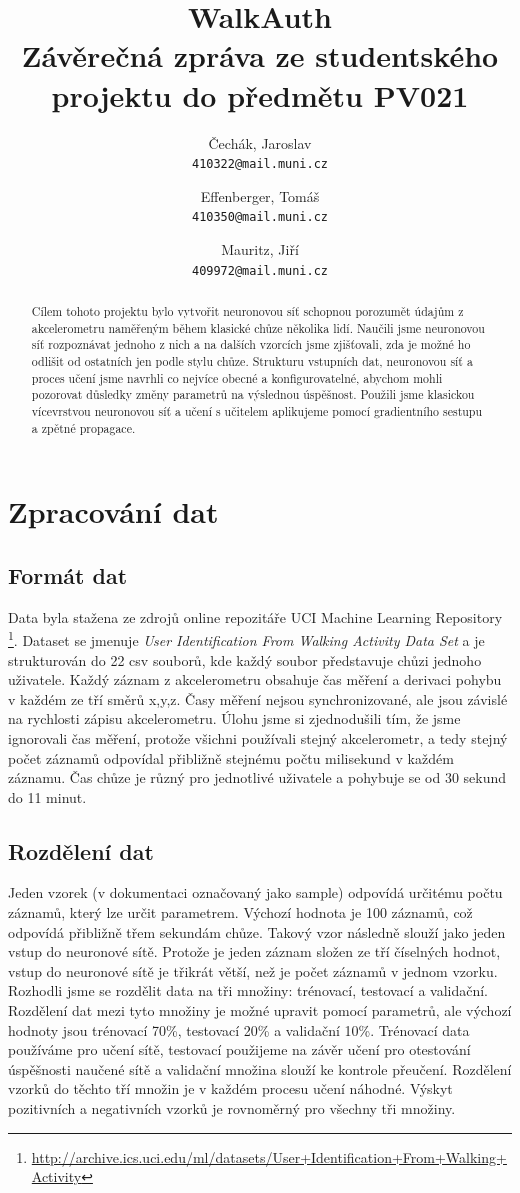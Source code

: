 \documentclass[a4paper, 10pt, twocolumn]{article}
\title{WalkAuth\\
\large Závěrečná zpráva ze studentského projektu do předmětu PV021
}
\author{Čechák, Jaroslav\\
	\texttt{410322@mail.muni.cz}
	\and
	Effenberger, Tomáš\\
	\texttt{410350@mail.muni.cz}
	\and
	Mauritz, Jiří\\
	\texttt{409972@mail.muni.cz}
}
\date{}
\begin{document}
\twocolumn[\maketitle ]


\begin{abstract}
  Cílem tohoto projektu bylo vytvořit neuronovou síť schopnou porozumět údajům z akcelerometru naměřeným během klasické chůze několika lidí. Naučili jsme neuronovou síť rozpoznávat jednoho z nich a na dalších vzorcích jsme zjišťovali, zda je možné ho odlišit od ostatních jen podle stylu chůze. Strukturu vstupních dat, neuronovou síť a proces učení jsme navrhli co nejvíce obecné a konfigurovatelné, abychom mohli pozorovat důsledky změny parametrů na výslednou úspěšnost. Použili jsme klasickou vícevrstvou neuronovou síť a učení s učitelem aplikujeme pomocí gradientního sestupu a zpětné propagace.
\end{abstract}

\section{Zpracování dat}
    \subsection{Formát dat}
        Data byla stažena ze zdrojů online repozitáře UCI Machine Learning Repository \footnote{\url{http://archive.ics.uci.edu/ml/datasets/User+Identification+From+Walking+Activity}}. Dataset se jmenuje \textit{User Identification From Walking Activity Data Set}  a je strukturován do 22 csv souborů, kde každý soubor představuje chůzi jednoho uživatele. Každý záznam z akcelerometru obsahuje čas měření a derivaci pohybu v každém ze tří směrů x,y,z. Časy měření nejsou synchronizované, ale jsou závislé na rychlosti zápisu akcelerometru. Úlohu jsme si zjednodušili tím, že jsme ignorovali čas měření, protože všichni používali stejný akcelerometr, a tedy stejný počet záznamů odpovídal přibližně stejnému počtu milisekund v každém záznamu. Čas chůze je různý pro jednotlivé uživatele a pohybuje se od 30 sekund do 11 minut.
    \subsection{Rozdělení dat}\label{rozdeleni_dat}
        Jeden vzorek (v dokumentaci označovaný jako sample) odpovídá určitému počtu záznamů, který lze určit parametrem. Výchozí hodnota je 100 záznamů, což odpovídá přibližně třem sekundám chůze. Takový vzor následně slouží jako jeden vstup do neuronové sítě. Protože je jeden záznam složen ze tří číselných hodnot, vstup do neuronové sítě je třikrát větší, než je počet záznamů v jednom vzorku.
        Rozhodli jsme se rozdělit data na tři množiny: trénovací, testovací a validační. Rozdělení dat mezi tyto množiny je možné upravit pomocí parametrů, ale výchozí hodnoty jsou trénovací 70\%, testovací 20\% a validační 10\%. Trénovací data používáme pro učení sítě, testovací použijeme na závěr učení pro otestování úspěšnosti naučené sítě a validační množina slouží ke kontrole přeučení. Rozdělení vzorků do těchto tří množin je v každém procesu učení náhodné. Výskyt pozitivních a negativních vzorků je rovnoměrný pro všechny tři množiny.
\end{document}
